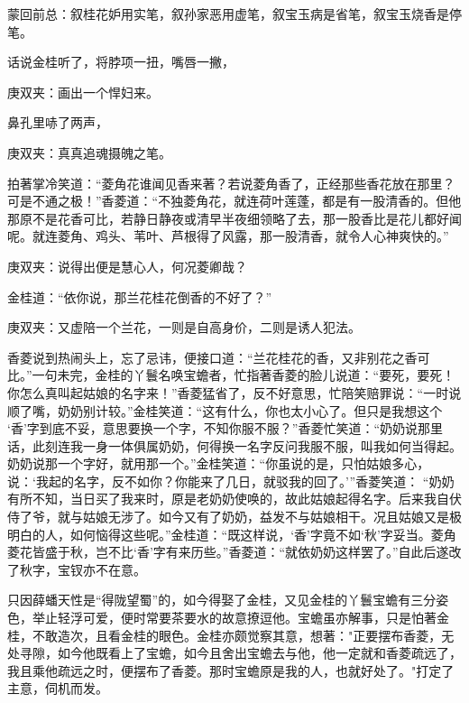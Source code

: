 
\begin{parag}
    \begin{note}蒙回前总：叙桂花妒用实笔，叙孙家恶用虚笔，叙宝玉病是省笔，叙宝玉烧香是停笔。\end{note}
\end{parag}


\begin{parag}
    话说金桂听了，将脖项一扭，嘴唇一撇，\begin{note}庚双夹：画出一个悍妇来。\end{note}鼻孔里哧了两声，\begin{note}庚双夹：真真追魂摄魄之笔。\end{note}拍著掌冷笑道：“菱角花谁闻见香来著？若说菱角香了，正经那些香花放在那里？可是不通之极！”香菱道：“不独菱角花，就连荷叶莲蓬，都是有一股清香的。但他那原不是花香可比，若静日静夜或清早半夜细领略了去，那一股香比是花儿都好闻呢。就连菱角、鸡头、苇叶、芦根得了风露，那一股清香，就令人心神爽快的。”\begin{note}庚双夹：说得出便是慧心人，何况菱卿哉？\end{note}金桂道：“依你说，那兰花桂花倒香的不好了？”\begin{note}庚双夹：又虚陪一个兰花，一则是自高身价，二则是诱人犯法。\end{note}香菱说到热闹头上，忘了忌讳，便接口道：“兰花桂花的香，又非别花之香可比。”一句未完，金桂的丫鬟名唤宝蟾者，忙指著香菱的脸儿说道：“要死，要死！你怎么真叫起姑娘的名字来！”香菱猛省了，反不好意思，忙陪笑赔罪说：“一时说顺了嘴，奶奶别计较。”金桂笑道：“这有什么，你也太小心了。但只是我想这个 ‘香’字到底不妥，意思要换一个字，不知你服不服？”香菱忙笑道：“奶奶说那里话，此刻连我一身一体俱属奶奶，何得换一名字反问我服不服，叫我如何当得起。奶奶说那一个字好，就用那一个。”金桂笑道：“你虽说的是，只怕姑娘多心，说：‘我起的名字，反不如你？你能来了几日，就驳我的回了。’”香菱笑道： “奶奶有所不知，当日买了我来时，原是老奶奶使唤的，故此姑娘起得名字。后来我自伏侍了爷，就与姑娘无涉了。如今又有了奶奶，益发不与姑娘相干。况且姑娘又是极明白的人，如何恼得这些呢。”金桂道：“既这样说，‘香’字竟不如‘秋’字妥当。菱角菱花皆盛于秋，岂不比‘香’字有来历些。”香菱道：“就依奶奶这样罢了。”自此后遂改了秋字，宝钗亦不在意。
\end{parag}


\begin{parag}
    只因薛蟠天性是“得陇望蜀”的，如今得娶了金桂，又见金桂的丫鬟宝蟾有三分姿色，举止轻浮可爱，便时常要茶要水的故意撩逗他。宝蟾虽亦解事，只是怕著金桂，不敢造次，且看金桂的眼色。金桂亦颇觉察其意，想著："正要摆布香菱，无处寻隙，如今他既看上了宝蟾，如今且舍出宝蟾去与他，他一定就和香菱疏远了，我且乘他疏远之时，便摆布了香菱。那时宝蟾原是我的人，也就好处了。"打定了主意，伺机而发。
\end{parag}


